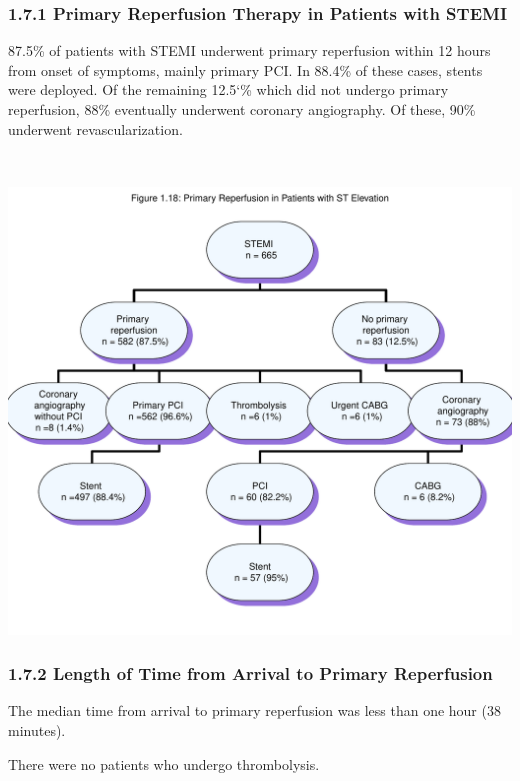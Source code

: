 \documentclass[
]{article}
\begin{document}
\subsubsection{1.7.1 Primary Reperfusion Therapy in Patients with
STEMI}\label{primary-reperfusion-therapy-in-patients-with-stemi}

87.5\% of patients with STEMI underwent primary reperfusion within 12
hours from onset of symptoms, mainly primary PCI. In 88.4\% of these
cases, stents were deployed. Of the remaining 12.5`\% which did not
undergo primary reperfusion, 88\% eventually underwent coronary
angiography. Of these, 90\% underwent revascularization.

~

\includegraphics{‏‏ACSIS_2024_v1_with_trend_pdf_files/figure-latex/unnamed-chunk-59-1.pdf}

\pagebreak

\subsubsection{1.7.2 Length of Time from Arrival to Primary
Reperfusion}\label{length-of-time-from-arrival-to-primary-reperfusion}

The median time from arrival to primary reperfusion was less than one
hour (38 minutes).

There were no patients who undergo thrombolysis. ~
\end{document}
